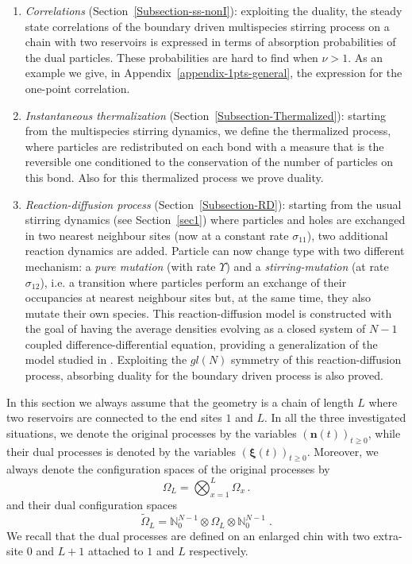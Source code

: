 \documentclass[10pt]{article}
\numberwithin{equation}{section}
\numberwithin{equation}{subsection}
\newcommand{\dt}{\;.}
\begin{document}
\begin{enumerate}
	\item \textit{Correlations} (Section~\ref{Subsection-ss-nonI}): exploiting the duality, the steady state correlations {\color{black} of the boundary driven multispecies stirring process on a chain with two reservoirs} is expressed in terms of absorption probabilities of the dual particles. These probabilities are hard to find when $\nu>1$. As an example we give, 
	in Appendix~\ref{appendix-1pts-general}, the expression for the one-point correlation.  
	\item \textit{Instantaneous thermalization} (Section~\ref{Subsection-Thermalized}): starting from the multispecies stirring dynamics, we define the thermalized process, where particles are redistributed on each bond with a measure that is the reversible one conditioned to the conservation of the number of particles on this bond. Also for this thermalized process we prove duality. 	
	\item \textit{Reaction-diffusion process} (Section~\ref{Subsection-RD}): {\color{black} starting from the usual stirring dynamics (see Section~\ref{sec1}) where particles and holes are exchanged in two nearest neighbour sites (now at a constant rate $\sigma_{11}$),} {\color{black}two additional reaction} dynamics are added. Particle can now change type {\color{black} with two different mechanism: a \textit{pure mutation} (with rate $\Upsilon$) and a \textit{stirring-mutation} (at rate $\sigma_{12}$), i.e. a transition where particles perform an exchange of their occupancies at nearest neighbour sites but, at the same time, they also mutate their own species.} {\color{black} This reaction-diffusion} model   is  constructed with the goal of having the average densities evolving as a closed system of $N-1$ coupled difference-differential equation, providing a generalization of the model studied in \cite{casini2022uphill}. {\color{black} Exploiting the $gl(N)$ symmetry of this reaction-diffusion process, absorbing duality} for the boundary driven process is also proved.
\end{enumerate}
{\color{black}In this section we always assume that the geometry is a chain of length $L$ where two reservoirs are connected to the end sites $1$ and $L$. In all the three investigated situations, we denote the original processes by the variables $\left(\bm{n}(t)\right)_{t\geq0}$, while their dual processes is denoted by the variables  $(\bm{\xi}(t))_{t\geq 0}$. Moreover, we always denote the configuration spaces of the original processes by
\begin{equation}\label{stateSpace-Chain}
	\Omega_{L}=\bigotimes_{x=1}^{L} \Omega_{x}\,.
\end{equation}
and their dual configuration spaces 
\begin{equation}\label{dualSpace-chain}
	\widetilde{\Omega}_{L}=\mathbb{N}_{0}^{N-1}\otimes \Omega_{L}\otimes \mathbb{N}_{0}^{N-1}\dt
\end{equation}
We recall that the dual processes are defined on an enlarged chin with two extra-site $0$ and $L+1$ attached to $1$ and $L$ respectively.}
\end{document}
